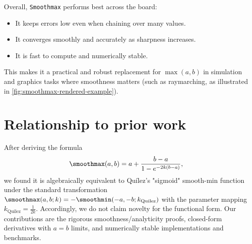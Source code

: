Overall, \texttt{Smoothmax} performs best across the board:
\begin{itemize}
    \item It keeps errors low even when chaining over many values.
    \item It converges smoothly and accurately as sharpness increases.
    \item It is fast to compute and numerically stable.
\end{itemize}

This makes it a practical and robust replacement for $\max(a, b)$ in simulation and graphics tasks where smoothness matters (such as raymarching, as illustrated in \cref{fig:smoothmax-rendered-example}).

\section{Relationship to prior work}

After deriving the formula
\begin{align}
    \smoothmax(a,b) = a + \frac{b - a}{1-e^{-2k(b - a)}},
\end{align}
we found it is algebraically equivalent to Quílez's "sigmoid" smooth-min function \cite{Quilez2013} under the standard transformation $\smoothmax(a,b; k) = -\smoothmin(-a,-b;k_\text{Quilez})$ with the parameter mapping $k_\text{Quilez} = \frac{1}{2k}$. Accordingly, we do not claim novelty for the functional form. Our contributions are the rigorous smoothness/analyticity proofs, closed-form derivatives with $a = b$ limits, and numerically stable implementations and benchmarks.
